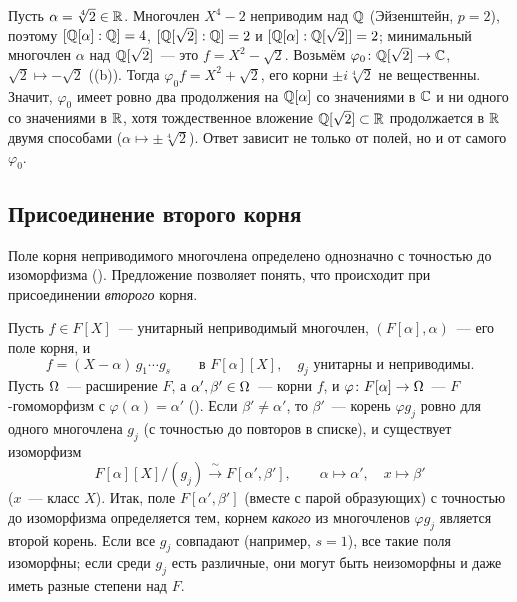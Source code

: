 \par\noindent\begin{minipage}{\linewidth}
\begin{center}
\end{center}
\end{minipage}\par\medskip

\begin{example}[2.4a]
Пусть $\alpha=\sqrt[4]2\in\mathbb R$. Многочлен $X^4-2$ неприводим над $\mathbb Q$ (Эйзенштейн, $p=2$), поэтому $[\mathbb Q[\alpha]:\mathbb Q]=4$,
$[\mathbb Q[\sqrt2]:\mathbb Q]=2$ и $[\mathbb Q[\alpha]:\mathbb Q[\sqrt2]]=2$; минимальный многочлен $\alpha$ над $\mathbb Q[\sqrt2]$~--- это $f=X^2-\sqrt2$.
Возьмём $\varphi_0\colon\mathbb Q[\sqrt2]\to\mathbb C$, $\sqrt2\mapsto-\sqrt2$ ((b)). Тогда $\varphi_0f=X^2+\sqrt2$, его корни
$\pm i\sqrt[4]2$ не вещественны. Значит, $\varphi_0$ имеет ровно два продолжения на $\mathbb Q[\alpha]$ со значениями в $\mathbb C$
и ни одного со значениями в $\mathbb R$, хотя тождественное вложение $\mathbb Q[\sqrt2]\subset\mathbb R$ продолжается в $\mathbb R$ двумя способами
($\alpha\mapsto\pm\sqrt[4]2$). Ответ зависит не только от полей, но и от самого $\varphi_0$.
\end{example}

\subsection*{Присоединение второго корня}

Поле корня неприводимого многочлена определено однозначно с точностью до изоморфизма (). Предложение
 позволяет понять, что происходит при присоединении \emph{второго} корня.

\begin{proposition}[2.4b]
Пусть $f\in F[X]$~--- унитарный неприводимый многочлен, $(F[\alpha],\alpha)$~--- его поле корня, и
\[
f=(X-\alpha)\,g_1\cdots g_s\qquad\text{в }F[\alpha][X],\quad g_j\text{ унитарны и неприводимы}.
\]
Пусть $\Omega$~--- расширение $F$, а $\alpha',\beta'\in\Omega$~--- корни $f$, и $\varphi\colon F[\alpha]\to\Omega$~--- $F$-гомоморфизм с
$\varphi(\alpha)=\alpha'$ (). Если $\beta'\ne\alpha'$, то $\beta'$~--- корень $\varphi g_j$ ровно для одного
многочлена $g_j$ (с точностью до повторов в списке), и существует изоморфизм
\[
F[\alpha][X]/(g_j)\xrightarrow{\ \sim\ }F[\alpha',\beta'],\qquad \alpha\mapsto\alpha',\quad x\mapsto\beta'
\]
($x$~--- класс $X$). Итак, поле $F[\alpha',\beta']$ (вместе с парой образующих) с точностью до изоморфизма определяется
тем, корнем \emph{какого} из многочленов $\varphi g_j$ является второй корень. Если все $g_j$ совпадают (например,
$s=1$), все такие поля изоморфны; если среди $g_j$ есть различные, они могут быть неизоморфны и даже иметь разные
степени над $F$.
\end{proposition}

